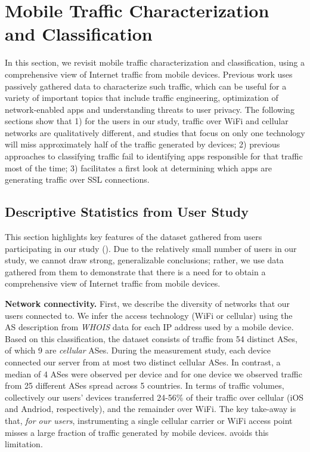 \section{Mobile Traffic Characterization and Classification}
\label{sec:classification-methodology}

In this section, we revisit mobile traffic characterization and classification, using a comprehensive 
view of Internet traffic from mobile devices. Previous work uses passively gathered data 
to characterize such traffic, which can be useful for a variety of important topics that include 
traffic engineering, optimization of network-enabled apps and understanding threats to user privacy. 
The following sections show that 1) for the users in our study, traffic over WiFi and cellular networks 
are qualitatively different, and studies that focus on only one technology will miss approximately 
half of the traffic generated by devices; 2) previous approaches to classifying traffic fail to identifying 
apps responsible for that traffic most of the time; 3) \platname{} facilitates a first look at 
determining which apps are generating traffic over SSL connections.

\subsection{Descriptive Statistics from User Study}

This section highlights key features of the dataset gathered from 
users participating in our study (\mobWild). 
Due to the relatively small number of users in our study, we cannot 
draw strong, generalizable conclusions; rather, we use data gathered 
from them to demonstrate that there is a need for \platname{} to 
obtain a comprehensive view of Internet traffic from mobile devices. 

\noindent\textbf{Network connectivity.} First, we describe the diversity 
of networks that our users connected to. 
We infer the access technology (WiFi or cellular) using the AS description from \emph{WHOIS} data for each IP address used by a mobile device.
Based on this classification, the \mobWild dataset consists of traffic from 54 distinct ASes, of which 9 are \emph{cellular} ASes.
During the measurement study, each device connected our \platname server from at most two distinct cellular ASes. 
In contrast, a median of 4 \wifi ASes were observed per device and for one device we observed traffic from 25 different \wifi ASes spread across 5 countries.
In terms of traffic volumes, collectively our users' devices transferred 24-56\% of their traffic over cellular (iOS and Andriod, respectively), and the 
remainder over WiFi. 
The key take-away is that, \emph{for our users}, instrumenting a single cellular carrier or WiFi access point misses a 
large fraction of traffic generated by mobile devices. \platname{} avoids this limitation.

